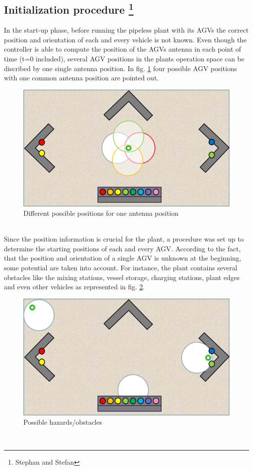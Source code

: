 \subsection[Initialization procedure]{Initialization procedure \footnote{Stephan and Stefan}}\label{Sec_Imp_Ini}
In the start-up phase, before running the pipeless plant with its AGVs the correct position and orientation of each and every vehicle is not known. Even though the controller is able to compute the position of the AGVs antenna in each point of time (t=0 included),  several AGV positions in the plants operation space can be discribed by one single antenna position. In fig. \ref{possible_initial_positions} four possible AGV positions with one common antenna position are pointed out. \\
\begin{figure}[!htbp]
\centering
\includegraphics[width = 16cm]{Pictures/possible_initial_positions}
\caption{Different possible positions for one antenna position}
\label{possible_initial_positions}
\end{figure}\\
Since the position information is crucial for the plant, a procedure was set up to determine the starting positions of each and every AGV.
According to the fact, that the position and orientation of a single AGV is unknown at the beginning, some potential are taken into account. For instance, the plant contains several obstacles like the mixing stations, vessel storage, charging stations, plant edges and even other vehicles as represented in fig. \ref{hazards}.\pagebreak
\begin{figure}[!htbp]
\centering
\includegraphics[width = 16cm]{Pictures/hazards}
\caption{Possible hazards/obstacles}
\label{hazards}
\end{figure}\\
